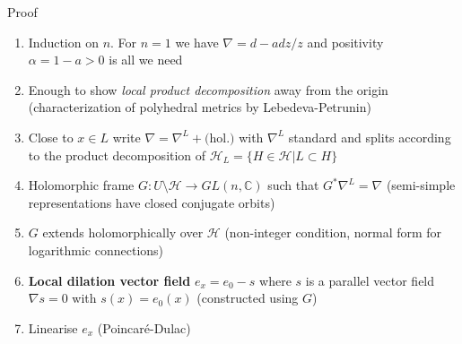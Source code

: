 \documentclass{beamer}
\newcommand{\C}{\mathbb{C}}
\newcommand{\mH}{\mathcal{H}}
\begin{document}
\begin{frame}{Proof}
	\begin{enumerate}
		\item Induction on \(n\). For \(n=1\) we have \(\nabla=d-adz/z\) and positivity \(\alpha=1-a>0\) is all we need
		\item Enough to show \emph{local product decomposition} away from the origin (characterization of polyhedral metrics by Lebedeva-Petrunin)
		\item Close to \(x \in L\) write  \(\nabla = \nabla^L + \mbox{(hol.)}\) with \(\nabla^L\) standard and splits according to the product decomposition of \(\mH_L=\{H \in \mH| L \subset H\}\)
		\item Holomorphic frame \(G: U \setminus \mH \to GL(n, \C)\) such that \(G^*\nabla^L=\nabla\) (semi-simple representations have closed conjugate orbits)
		\item \(G\) extends holomorphically over \(\mH\) (non-integer condition, normal form for logarithmic connections)
		\item \textbf{Local dilation vector field} \(e_x = e_0 - s\) where \(s\) is a parallel vector field \(\nabla s = 0\) with \(s(x)=e_0(x)\) (constructed using \(G\))
		\item Linearise \(e_x\) (Poincar\'e-Dulac)
	\end{enumerate}
\centering
{}
\end{frame}
\end{document}
